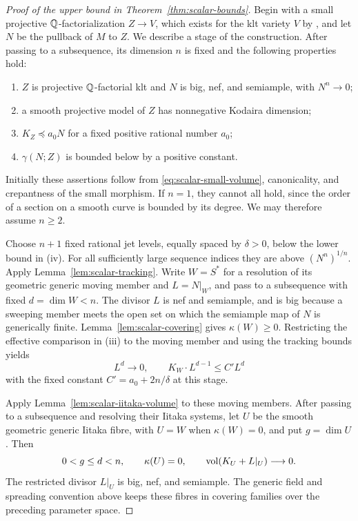 \begin{proof}[Proof of the upper bound in Theorem~\ref{thm:scalar-bounds}]
Begin with a small projective $\mathbb Q$-factorialization $Z\to V$, which
exists for the klt variety $V$ by \cite[Corollary~1.4.3]{BCHM2010},
and let $N$ be the pullback of $M$ to $Z$.  We describe a stage of the construction.  After
passing to a subsequence, its dimension $n$ is fixed and the following
properties hold:
\begin{enumerate}[label=(\roman*)]
 \item $Z$ is projective $\mathbb Q$-factorial klt and $N$ is big, nef, and
       semiample, with $N^n\to0$;
 \item a smooth projective model of $Z$ has nonnegative Kodaira dimension;
 \item $K_Z\preceq a_0N$ for a fixed positive rational number $a_0$;
 \item $\gamma(N;Z)$ is bounded below by a positive constant.
\end{enumerate}
Initially these assertions follow from \eqref{eq:scalar-small-volume},
canonicality, and crepantness of the small morphism.  If $n=1$, they
cannot all hold, since the order of a section on a smooth curve is
bounded by its degree.  We may therefore assume $n\ge2$.

Choose $n+1$ fixed rational jet levels, equally spaced by $\delta>0$,
below the lower bound in (iv).  For all sufficiently large sequence indices they are above
$(N^n)^{1/n}$.  Apply Lemma~\ref{lem:scalar-tracking}.  Write
$W=S^*$ for a resolution of its geometric generic moving member and
$L=N|_W$, and pass to a subsequence with fixed $d=\dim W<n$.
The divisor $L$ is nef and semiample, and is big because a sweeping
member meets the open set on which the semiample map of $N$ is
generically finite.  Lemma~\ref{lem:scalar-covering} gives
$\kappa(W)\ge0$.  Restricting the effective comparison in (iii) to
the moving member and using the tracking bounds yields
\begin{equation}\label{eq:scalar-small-intersections}
 L^d\longrightarrow0,
 \qquad K_W\cdot L^{d-1}\le C' L^d
\end{equation}
with the fixed constant $C'=a_0+2n/\delta$ at this stage.

Apply Lemma~\ref{lem:scalar-iitaka-volume} to these moving members.
After passing to a subsequence and resolving their Iitaka systems,
let $U$ be the smooth geometric generic Iitaka fibre, with $U=W$ when
$\kappa(W)=0$, and put $g=\dim U$.  Then
\[
 0<g\le d<n,\qquad \kappa(U)=0,\qquad
 \operatorname{vol}(K_U+L|_U)\longrightarrow0.
\]
The restricted divisor $L|_U$ is big, nef, and semiample.  The generic
field and spreading convention above keeps these fibres in covering
families over the preceding parameter space.


\end{proof}
